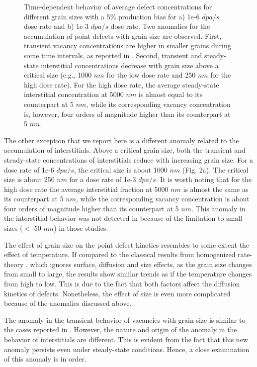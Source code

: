 \documentclass[utf8]{frontiersSCNS} %
\begin{document}
\begin{figure}[h!]
        \caption{Time-dependent behavior of average defect concentrations for different grain sizes with a 5\% production bias for a) 1e-6 $dpa/s$ dose rate and b) 1e-3 $dpa/s$ dose rate. Two anomalies for the accumulation of point defects with grain size are observed. First, transient vacancy concentrations are higher in smaller grains during some time intervals, as reported in \citep{yang2010}. Second, transient and steady-state interstitial concentrations decrease with grain size above a critical size (e.g., 1000 $nm$ for the low dose rate and 250 $nm$ for the high dose rate). For the high dose rate, the average steady-state interstitial concentration at 5000 $nm$ is almost equal to its counterpart at 5 $nm$, while its corresponding vacancy concentration is, however, four orders of magnitude higher than its counterpart at 5 $nm$.}
        \label{figure:average_concentrations_neutron_5}
    \end{figure}
    
    The other exception that we report here is a different anomaly related to the accumulation of interstitials. Above a critical grain size, both the transient and steady-state concentrations of interstitials reduce with increasing grain size. For a dose rate of 1e-6 $dpa/s$, the critical size is about 1000 $nm$ (Fig. 2a). The critical size is about 250 $nm$ for a dose rate of 1e-3 $dpa/s$. It is worth noting that for the high dose rate the average interstitial fraction at 5000 $nm$ is almost the same as its counterpart at 5 $nm$, while the corresponding vacancy concentration is about four orders of magnitude higher than its counterpart at 5 $nm$. This anomaly in the interstitial behavior was not detected in \citep{yang2010,demkowicz2011} because of the limitation to small sizes ($<$ 50 $nm$) in those studies.
    
    The effect of grain size on the point defect kinetics resembles to some extent the effect of temperature. If compared to the classical results from homogenized rate-theory \citep{was2017}, which ignores surface, diffusion and size effects, as the grain size changes from small to large, the results show similar trends as if the temperature changes from high to low. This is due to the fact that both factors affect the diffusion kinetics of defects. Nonetheless, the effect of size is even more complicated because of the anomalies discussed above.
    
    The anomaly in the transient behavior of vacancies with grain size is similar to the cases reported in \citep{yang2010}. However, the nature and origin of the anomaly in the behavior of interstitials are different. This is evident from the fact that this new anomaly persists even under steady-state conditions. Hence, a close examination of this anomaly is in order.
    
\end{document}
